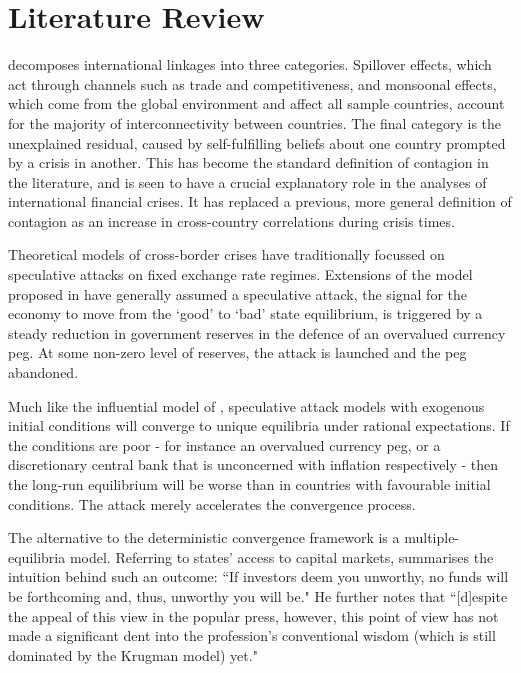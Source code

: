 \documentclass[../base.tex]{subfiles}
\begin{document}
\section{Literature Review}
\label{lit}

\cite{masson1998contagion} decomposes international linkages into three categories. Spillover effects, which act through channels such as trade and competitiveness, and monsoonal effects, which come from the global environment and affect all sample countries, account for the majority of interconnectivity between countries. The final category is the unexplained residual, caused by self-fulfilling beliefs about one country prompted by a crisis in another. This has become the standard definition of contagion in the literature, and is seen to have a crucial explanatory role in the analyses of international financial crises. It has replaced a previous, more general definition of contagion as an increase in cross-country correlations during crisis times.


Theoretical models of cross-border crises have traditionally focussed on speculative attacks on fixed exchange rate regimes. Extensions of the model proposed in \cite{krugman1979model} have generally assumed a speculative attack, the signal for the economy to move from the `good' to `bad' state equilibrium, is triggered by a steady reduction in government reserves in the defence of an overvalued currency peg. At some non-zero level of reserves, the attack is launched and the peg abandoned.

Much like the influential model of \cite{barro1983rules}, speculative attack models with exogenous initial conditions will converge to unique equilibria under rational expectations. If the conditions are poor - for instance an overvalued currency peg, or a discretionary central bank that is unconcerned with inflation respectively - then the long-run equilibrium will be worse than in countries with favourable initial conditions. The attack merely accelerates the convergence process.


The alternative to the deterministic convergence framework is a multiple-equilibria model. Referring to states' access to capital markets, \cite{calvo1995varieties} summarises the intuition behind such an outcome: ``If investors deem you unworthy, no funds will be forthcoming and, thus, unworthy you will be." He further notes that ``[d]espite the appeal of this view in the popular press, however, this point of view has not made a significant dent into the profession's conventional wisdom (which is still dominated by the Krugman model) yet."
\end{document}

